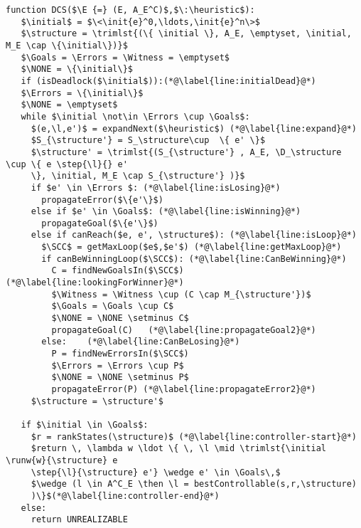 \lstset{numbers=left, numberstyle=\tiny, stepnumber=1, numbersep=5pt}
\begin{lstlisting}[language={pseudocode},label={lst:dcs},caption={Algoritmo de exploración dirigida on-the-fly.},float=ht, frame=single]
 function DCS($\E {=} (E, A_E^C)$,$\:\heuristic$):
   $\initial$ = $\<\init{e}^0,\ldots,\init{e}^n\>$
   $\structure = \trimlst{(\{ \initial \}, A_E, \emptyset, \initial, M_E \cap \{\initial\})}$
   $\Goals = \Errors = \Witness = \emptyset$
   $\NONE = \{\initial\}$
   if (isDeadlock($\initial$)):(*@\label{line:initialDead}@*)
   $\Errors = \{\initial\}$
   $\NONE = \emptyset$
   while $\initial \not\in \Errors \cup \Goals$:
     $(e,\l,e')$ = expandNext($\heuristic$) (*@\label{line:expand}@*)
     $S_{\structure'} = S_\structure\cup  \{ e' \}$
     $\structure' = \trimlst{(S_{\structure'} , A_E, \D_\structure \cup \{ e \step{\l}{} e' 
     \}, \initial, M_E \cap S_{\structure'} )}$
     if $e' \in \Errors $: (*@\label{line:isLosing}@*)
       propagateError($\{e'\}$)
     else if $e' \in \Goals$: (*@\label{line:isWinning}@*)
       propagateGoal($\{e'\}$)
     else if canReach($e, e', \structure$): (*@\label{line:isLoop}@*)
       $\SCC$ = getMaxLoop($e$,$e'$) (*@\label{line:getMaxLoop}@*)
       if canBeWinningLoop($\SCC$): (*@\label{line:CanBeWinning}@*)
         C = findNewGoalsIn($\SCC$) (*@\label{line:lookingForWinner}@*)
         $\Witness = \Witness \cup (C \cap M_{\structure'})$
         $\Goals = \Goals \cup C$
         $\NONE = \NONE \setminus C$
         propagateGoal(C)   (*@\label{line:propagateGoal2}@*)
       else:    (*@\label{line:CanBeLosing}@*)
         P = findNewErrorsIn($\SCC$)
         $\Errors = \Errors \cup P$
         $\NONE = \NONE \setminus P$
         propagateError(P) (*@\label{line:propagateError2}@*)
     $\structure = \structure'$
 
   if $\initial \in \Goals$:
     $r = rankStates(\structure)$ (*@\label{line:controller-start}@*)
     $return \, \lambda w \ldot \{ \, \l \mid \trimlst{\initial \runw{w}{\structure} e 
     \step{\l}{\structure} e'} \wedge e' \in \Goals\,$
     $\wedge (l \in A^C_E \then \l = bestControllable(s,r,\structure) 
     )\}$(*@\label{line:controller-end}@*)
   else:
     return UNREALIZABLE
\end{lstlisting}  

